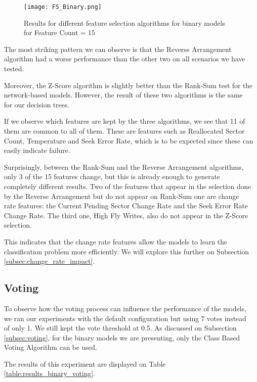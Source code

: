 \begin{figure}
\begin{center}
  \texttt{[image: FS\_Binary.png]}
  \caption[Feature Selection Results]{Results for different feature selection algorithms for binary models for Feature Count = 15}
  \label{fig:fs_binary}
\end{center}
\end{figure}

The most striking pattern we can observe is that the Reverse Arrangement algorithm had a worse performance than the other two on all scenarios we have tested.

Moreover, the Z-Score algorithm is slightly better than the Rank-Sum test for the network-based models.
However, the result of these two algorithms is the same for our decision trees.

If we observe which features are kept by the three algorithms, we see that 11 of them are common to all of them.
These are features such as Reallocated Sector Count, Temperature and Seek Error Rate, which is to be expected since these can easily indicate failure.

Surprisingly, between the Rank-Sum and the Reverse Arrangement algorithms, only 3 of the 15 features change, but this is already enough to generate completely different results.
Two of the features that appear in the selection done by the Reverse Arrangement but do not appear on Rank-Sum one are change rate features: the Current Pending Sector Change Rate and the Seek Error Rate Change Rate.
The third one, High Fly Writes, also do not appear in the Z-Score selection.

This indicates that the change rate features allow the models to learn the classification problem more efficiently.
We will explore this further on Subsection \ref{subsec:change_rate_impact}.

\subsection{Voting}

To observe how the voting process can influence the performance of the models, we ran our experiments with the default configuration but using 7 votes instead of only 1.
We still kept the vote threshold at 0.5.
As discussed on Subsection \ref{subsec:voting}, for the binary models we are presenting, only the Class Based Voting Algorithm can be used.

The results of this experiment are displayed on Table \ref{table:results_binary_voting}. 

